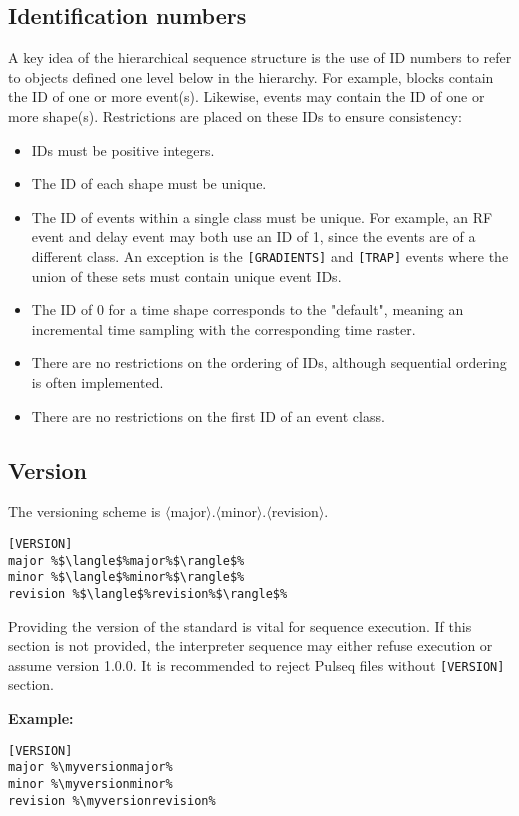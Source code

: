 \documentclass{article}
\def\myversionmajor{1}
\def\myversionminor{4}
\def\myversionrevision{1}
\begin{document}
\subsection{Identification numbers}
A key idea of the hierarchical sequence structure is the use of ID numbers to refer to objects defined one level below in the hierarchy. For example, blocks contain the ID of one or more event(s). Likewise, events may contain the ID of one or more shape(s). Restrictions are placed on these IDs to ensure consistency:
\begin{itemize}
\item IDs must be positive integers.
\item The ID of each shape must be unique.
\item The ID of events within a single class must be unique. For example, an RF event and delay event may both use an ID of 1, since the events are of a different class. An exception is the \verb.[GRADIENTS]. and \verb.[TRAP]. events where the union of these sets must contain unique event IDs.
\item The ID of 0 for a time shape corresponds to the "default", meaning an incremental time sampling with the corresponding time raster.
\item There are no restrictions on the ordering of IDs, although sequential ordering is often implemented.
\item There are no restrictions on the first ID of an event class.
\end{itemize}

\subsection{Version}

The versioning scheme is $\langle$major$\rangle$.$\langle$minor$\rangle$.$\langle$revision$\rangle$.

\begin{lstlisting}[escapechar=\%]
[VERSION]
major %$\langle$%major%$\rangle$%
minor %$\langle$%minor%$\rangle$%
revision %$\langle$%revision%$\rangle$%
\end{lstlisting}

Providing the version of the standard is vital for sequence execution.
If this section is not provided, the interpreter sequence may either refuse execution or assume version 1.0.0. It is recommended to reject Pulseq files without \verb.[VERSION]. section.

\textbf{Example:}
\begin{lstlisting}[escapechar=\%]
[VERSION]
major %\myversionmajor%
minor %\myversionminor%
revision %\myversionrevision%
\end{lstlisting}
\end{document}
